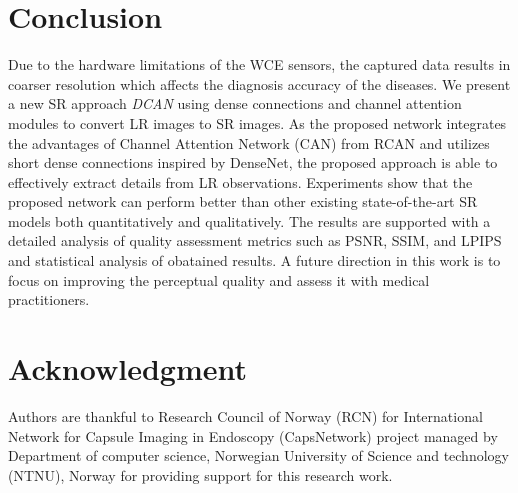 \documentclass[conference]{IEEEtran}
\begin{document}
\section{Conclusion}
Due to the hardware limitations of the WCE sensors, the captured data results in coarser resolution which affects the diagnosis accuracy of the diseases. We present a new SR approach \emph{DCAN} using dense connections and channel attention modules to convert LR images to SR images. As the proposed network integrates the advantages of Channel Attention Network (CAN) from RCAN and utilizes short dense connections inspired by DenseNet, the proposed approach is able to effectively extract details from LR observations. Experiments show that the proposed  network can perform better than other  existing state-of-the-art SR models both quantitatively and qualitatively. The results are supported with a detailed analysis of quality assessment metrics such as PSNR, SSIM, and LPIPS and statistical analysis of obatained results. A future direction in this work is to focus on improving the perceptual quality and assess it with medical practitioners. 

\section*{Acknowledgment}
Authors are thankful to Research Council of Norway (RCN) for International Network for Capsule Imaging in Endoscopy (CapsNetwork) project managed by Department of computer science, Norwegian University of Science and technology (NTNU), Norway for providing support for this research work.


\balance


\end{document}

